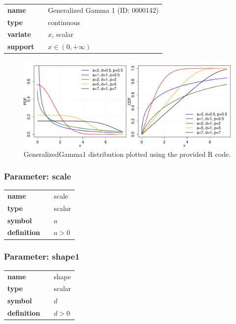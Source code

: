   \bigskip 

\begin{tabular}{p{2cm}cl}
\textbf{name} & & Generalized Gamma 1 (ID: 0000142)\\ 
 
\textbf{type} & & continuous \\ 

\textbf{variate} & & $x$, scalar \\ 

\textbf{support} & & $x \in (0,+\infty)$
\end{tabular}

\begin{figure}[ht!]
\centering
  \includegraphics[width=140mm]{pics/GeneralizedGamma1.pdf}
 \caption{GeneralizedGamma1 distribution plotted using the provided R code.}
 \label{fig:GeneralizedGamma1}
\end{figure}

\subsubsection*{Parameter: scale}

\noindent\begin{tabular}{p{2cm}cl}
\textbf{name} & & scale \\
\textbf{type} & & scalar \\
\textbf{symbol} & & $a$  \\
\textbf{definition} & & $a > 0$
\end{tabular}
\subsubsection*{Parameter: shape1}

\noindent\begin{tabular}{p{2cm}cl}
\textbf{name} & & shape \\
\textbf{type} & & scalar \\
\textbf{symbol} & & $d$  \\
\textbf{definition} & & $d > 0$
\end{tabular}
